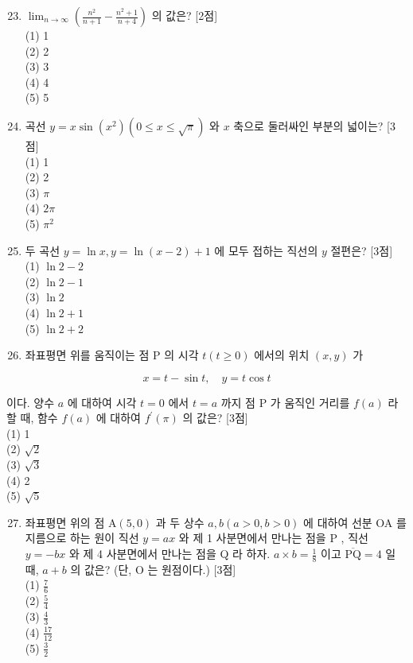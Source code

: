 \documentclass[10pt]{article}
\begin{document}
\begin{enumerate}
  \setcounter{enumi}{22}
  \item \(\lim _{n \rightarrow \infty}\left(\frac{n^{2}}{n+1}-\frac{n^{2}+1}{n+4}\right)\) 의 값은? [2점]\\
(1) 1\\
(2) 2\\
(3) 3\\
(4) 4\\
(5) 5

  \item 곡선 \(y=x \sin \left(x^{2}\right)(0 \leq x \leq \sqrt{\pi})\) 와 \(x\) 축으로 둘러싸인 부분의 넓이는? [3점]\\
(1) 1\\
(2) 2\\
(3) \(\pi\)\\
(4) \(2 \pi\)\\
(5) \(\pi^{2}\)

  \item 두 곡선 \(y=\ln x, y=\ln (x-2)+1\) 에 모두 접하는 직선의 \(y\) 절편은? [3점]\\
(1) \(\ln 2-2\)\\
(2) \(\ln 2-1\)\\
(3) \(\ln 2\)\\
(4) \(\ln 2+1\)\\
(5) \(\ln 2+2\)

  \item 좌표평면 위를 움직이는 점 P 의 시각 \(t(t \geq 0)\) 에서의 위치 \((x, y)\) 가

\end{enumerate}

\[
x=t-\sin t, \quad y=t \cos t
\]

이다. 양수 \(a\) 에 대하여 시각 \(t=0\) 에서 \(t=a\) 까지 점 P 가 움직인 거리를 \(f(a)\) 라 할 때, 함수 \(f(a)\) 에 대하여 \(f^{\prime}(\pi)\) 의 값은? [3점]\\
(1) 1\\
(2) \(\sqrt{2}\)\\
(3) \(\sqrt{3}\)\\
(4) 2\\
(5) \(\sqrt{5}\)

\begin{enumerate}
  \setcounter{enumi}{26}
  \item 좌표평면 위의 점 \(\mathrm{A}(5,0)\) 과 두 상수 \(a, b(a>0, b>0)\) 에 대하여 선분 OA 를 지름으로 하는 원이 직선 \(y=a x\) 와 제 1 사분면에서 만나는 점을 P , 직선 \(y=-b x\) 와 제 4 사분면에서 만나는 점을 Q 라 하자. \(a \times b=\frac{1}{8}\) 이고 \(\overline{\mathrm{PQ}}=4\) 일 때, \(a+b\) 의 값은? (단, O 는 원점이다.) [3점]\\
(1) \(\frac{7}{6}\)\\
(2) \(\frac{5}{4}\)\\
(3) \(\frac{4}{3}\)\\
(4) \(\frac{17}{12}\)\\
(5) \(\frac{3}{2}\)
\end{enumerate}
\end{document}

